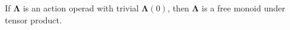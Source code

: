 \documentclass{amsbook} %
\newcommand{\ML}{\mathbf{\Lambda}}
\newcommand{\ELnn}{E\Lambda(\underline{2n})}
\numberwithin{section}{chapter}
\begin{document}
\begin{prop} \label{Gfree} If $\ML$ is an action operad with trivial $\ML(0)$, then $\ML$ is a free monoid under tensor product.
\end{prop}
\end{document}
